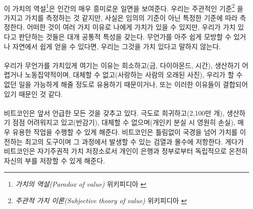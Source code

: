 \paragraph{}
이 가치의 역설\footnote{\textit{가치의 역설(Paradox of value)} 위키피디아 \cite{wiki:paradox-of-value}}은 
인간의 매우 흥미로운 일면을 보여준다. 
우리는 주관적인 기준\footnote{\textit{주관적 가치 이론(Subjective theory of value)} 위키피디아 \cite{wiki:subjective-theory-of-value}}
을 가지고 가치를 측정하는 것 같지만, 사실은 임의의 기준이 아닌 특정한 기준에 따라 측정한다. 
어떠한 것이 여러 가지 이유로 나에게 가치가 있을 수 있지만, 우리가 가치 있다고 판단하는 것들은 대개 공통적 특성을 갖는다.
무언가를 아주 쉽게 모방할 수 있거나 자연에서 쉽게 얻을 수 있다면, 우리는 그것을 가치 있다고 말하지 않는다. 


% 
\paragraph{}
우리가 무언가를 가치있게 여기는 이유는 
희소하고(금, 다이아몬드, 시간),
생산하기 어렵거나 노동집약적이며, 대체할 수 없고(사랑하는 사람의 오래된 사진),
우리가 할 수 없던 일을 가능하게 해줄 정도로 유용하기 때문이거나, 
또는 이러한 이유들이 결합되어 있기 때문인 것 같다.


\paragraph{}
비트코인은 앞서 언급한 모든 것을 갖추고 있다. 극도로 희귀하고(2,100만 개),
생산하기 점점 어려워지고 있고(반감기), 대체할 수 없으며(개인키 분실 시 영원히 손실),
매우 유용한 작업을 수행할 수 있게 해준다. 비트코인은 틀림없이 국경을 넘어 가치를 이전하는 최고의 도구이며 
그 과정에서 발생할 수 있는 검열과 몰수에 저항한다. 게다가 비트코인은 자기주권적 가치 저장소로서
개인이 은행과 정부로부터 독립적으로 온전히 자신의 부를 저장할 수 있게 해준다.

